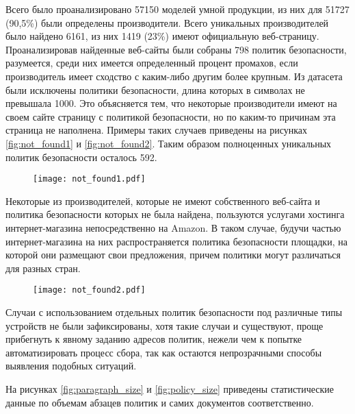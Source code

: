 \documentclass[../main]{subfiles}
\begin{document}
Всего было проанализировано 57150 моделей умной продукции, из них для 51727 (90,5\%) были определены производители. Всего уникальных производителей было найдено 6161, из них 1419 (23\%) имеют официальную веб-страницу. Проанализировав найденные веб-сайты были собраны 798 политик безопасности, разумеется, среди них имеется определенный процент промахов, если производитель имеет сходство с каким-либо другим более крупным. Из датасета были исключены политики безопасности, длина которых в символах не превышала 1000. Это объясняется тем, что некоторые производители имеют на своем сайте страницу с политикой безопасности, но по каким-то причинам эта страница не наполнена. Примеры таких случаев приведены на рисунках \ref{fig:not_found1} и \ref{fig:not_found2}. Таким образом полноценных уникальных политик безопасности осталось 592.

\begin{figure}[H]
    \centering
    {\texttt{[image: not\_found1.pdf]}}
    \vspace{-\baselineskip}
\end{figure}

Некоторые из производителей, которые не имеют собственного веб-сайта и политика безопасности которых не была найдена, пользуются услугами хостинга интернет-магазина непосредственно на Amazon. В таком случае, будучи частью интернет-магазина на них распространяется политика безопасности площадки, на которой они размещают свои предложения, причем политики могут различаться для разных стран.

\begin{figure}[H]
    \centering
    {\texttt{[image: not\_found2.pdf]}}
    \vspace{-\baselineskip}
\end{figure}

 Случаи с использованием отдельных политик безопасности под различные типы устройств не были зафиксированы, хотя такие случаи и существуют, проще прибегнуть к явному заданию адресов политик, нежели чем к попытке автоматизировать процесс сбора, так как остаются непрозрачными способы выявления подобных ситуаций.

На рисунках \ref{fig:paragraph_size} и \ref{fig:policy_size} приведены статистические данные по объемам абзацев политик и самих документов соответственно.
\end{document}
